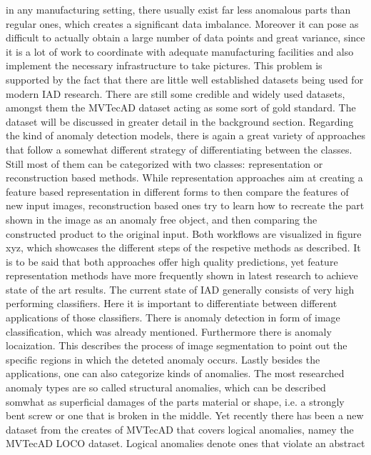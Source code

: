 in any manufacturing setting, there usually exist far less anomalous parts than regular ones, which creates a significant data imbalance. 
Moreover it can pose as difficult to actually obtain a large number of data points and great variance, since it is a lot of work to 
coordinate with adequate manufacturing facilities and also implement the necessary infrastructure to take pictures. This problem is supported 
by the fact that there are little well established datasets being used for modern IAD research. There are still some credible and widely used 
datasets, amongst them the MVTecAD \cite{MVTEC_Bergmann_2021} dataset acting as some sort of gold standard. The dataset will be discussed in greater detail 
in the background section. Regarding the kind of anomaly detection models, there is again a great variety of approaches that follow a 
somewhat different strategy of differentiating between the classes. Still most of them can be categorized with two classes: representation 
or reconstruction based methods. While representation approaches aim at creating a feature based representation in different forms to then 
compare the features of new input images, reconstruction based ones try to learn how to recreate the part shown in the image as an anomaly 
free object, and then comparing the constructed product to the original input. Both workflows are visualized in figure xyz, which showcases 
the different steps of the respetive methods as described. It is to be said that both approaches offer high quality predictions, yet 
feature representation methods have more frequently shown in latest research to achieve state of the art results.
\newline
The current state of IAD generally consists of very high performing classifiers. Here it is important to differentiate between different 
applications of those classifiers. There is anomaly detection in form of image classification, which was already mentioned. 
Furthermore there is anomaly locaization. This describes the process of image segmentation to point out the specific regions in which 
the deteted anomaly occurs. Lastly besides the applications, one can also categorize kinds of anomalies. The most researched anomaly types 
are so called structural anomalies, which can be described somwhat as superficial damages of the parts material or shape, i.e. a strongly 
bent screw or one that is broken in the middle. Yet recently there has been a new dataset from the creates of MVTecAD that covers logical 
anomalies, namey the MVTecAD LOCO \cite{LOCODentsAndScratchesBergmann2022} dataset. Logical anomalies denote ones that violate an abstract 
